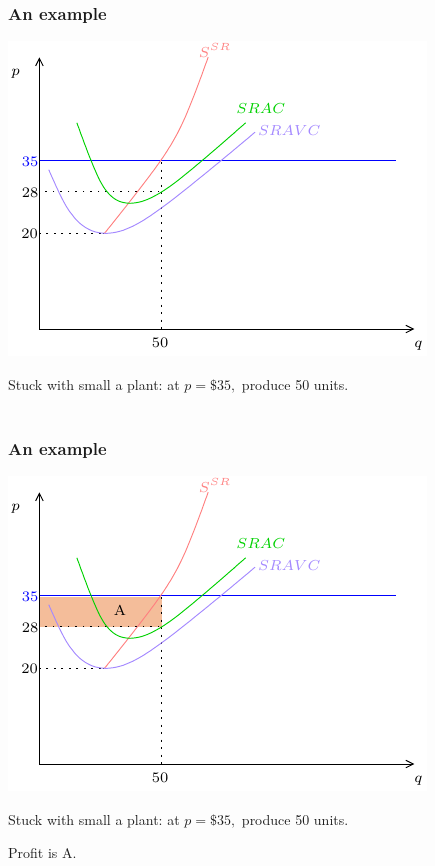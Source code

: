 \documentclass[xcolor=pdftex,dvipsnames]{beamer}
\begin{document}
\begin{frame}
\frametitle{An example}
\begin{center}
\includegraphics{pics/LRS1}
\end{center}
Stuck with small a plant: at $p=\$35,$ produce 50 units. \\

\
\end{frame}


\begin{frame}
\frametitle{An example}
\begin{center}
\includegraphics{pics/LRS2}
\end{center}
Stuck with small a plant: at $p=\$35,$ produce 50 units. 

Profit is A.
\end{frame}
\end{document}
